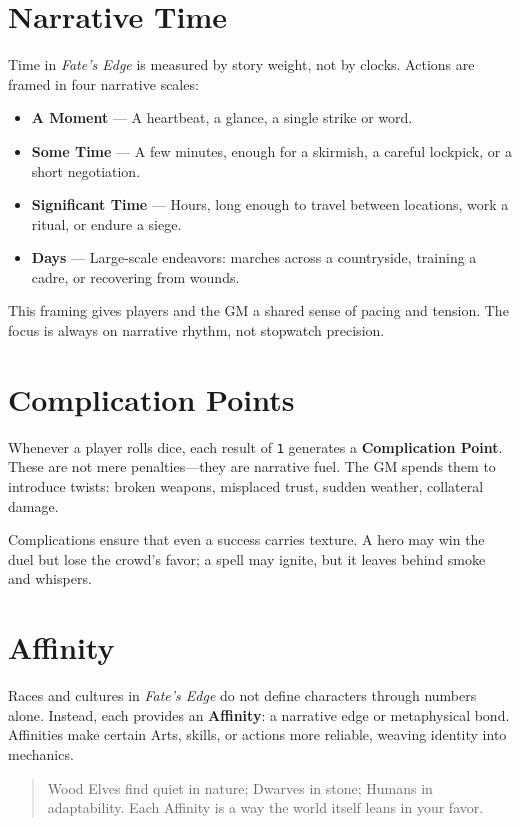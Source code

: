 \documentclass[12pt]{book}
\begin{document}
\section{Narrative Time}
Time in \textit{Fate’s Edge} is measured by story weight, not by clocks. Actions are framed in four narrative scales:
\begin{itemize}
  \item \textbf{A Moment} — A heartbeat, a glance, a single strike or word.
  \item \textbf{Some Time} — A few minutes, enough for a skirmish, a careful lockpick, or a short negotiation.
  \item \textbf{Significant Time} — Hours, long enough to travel between locations, work a ritual, or endure a siege.
  \item \textbf{Days} — Large-scale endeavors: marches across a countryside, training a cadre, or recovering from wounds.
\end{itemize}
This framing gives players and the GM a shared sense of pacing and tension. The focus is always on narrative rhythm, not stopwatch precision.  

\section{Complication Points}
Whenever a player rolls dice, each result of \texttt{1} generates a \textbf{Complication Point}. These are not mere penalties—they are narrative fuel. The GM spends them to introduce twists: broken weapons, misplaced trust, sudden weather, collateral damage.  

Complications ensure that even a success carries texture. A hero may win the duel but lose the crowd’s favor; a spell may ignite, but it leaves behind smoke and whispers.  

\section{Affinity}
Races and cultures in \textit{Fate’s Edge} do not define characters through numbers alone. Instead, each provides an \textbf{Affinity}: a narrative edge or metaphysical bond. Affinities make certain Arts, skills, or actions more reliable, weaving identity into mechanics.  
\begin{quote}
Wood Elves find quiet in nature; Dwarves in stone; Humans in adaptability. Each Affinity is a way the world itself leans in your favor.
\end{quote}
\end{document}
